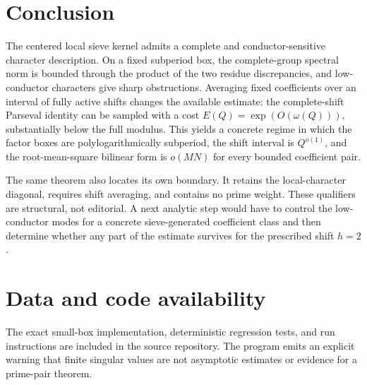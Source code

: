 \documentclass[11pt]{article}
\theoremstyle{definition}
\theoremstyle{remark}
\begin{document}
\section{Conclusion}\label{sec:conclusion}

The centered local sieve kernel admits a complete and conductor-sensitive character description.  On a fixed subperiod box, the complete-group spectral norm is bounded through the product of the two residue discrepancies, and low-conductor characters give sharp obstructions.  Averaging fixed coefficients over an interval of fully active shifts changes the available estimate: the complete-shift Parseval identity can be sampled with a cost $E(Q)=\exp(O(\omega(Q)))$, substantially below the full modulus.  This yields a concrete regime in which the factor boxes are polylogarithmically subperiod, the shift interval is $Q^{o(1)}$, and the root-mean-square bilinear form is $o(MN)$ for every bounded coefficient pair.

The same theorem also locates its own boundary.  It retains the local-character diagonal, requires shift averaging, and contains no prime weight.  These qualifiers are structural, not editorial.  A next analytic step would have to control the low-conductor modes for a concrete sieve-generated coefficient class and then determine whether any part of the estimate survives for the prescribed shift $h=2$.

\section*{Data and code availability}

The exact small-box implementation, deterministic regression tests, and run instructions are included in the source repository.  The program emits an explicit warning that finite singular values are not asymptotic estimates or evidence for a prime-pair theorem.



\end{document}
